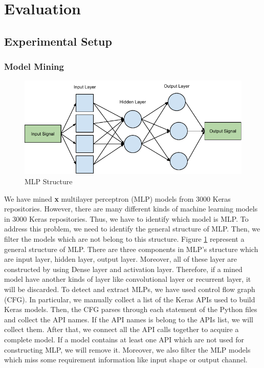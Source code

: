 \section{Evaluation}
\label{sec:evaluation}
\subsection{Experimental Setup}
\subsubsection{\textbf{Model Mining}}
\begin{figure}
	\includegraphics[width=0.8\linewidth]{mlp}
	\centering
	\caption{MLP Structure}
	\label{fig:mlp}
\end{figure}
We have mined {\bf x} multilayer perceptron (MLP) models from 3000 Keras repositories. However, there are many different kinds of machine learning models in 3000 Keras repositories. Thus, we have to identify which model is MLP. To address this problem, we need to identify the general structure of MLP. Then, we filter the models which are not belong to this structure. Figure \ref{fig:mlp} represent a general structure of MLP. There are three components in MLP's structure which are input layer, hidden layer, output layer. Moreover, all of these layer are constructed by using Dense layer and activation layer. Therefore, if a mined model have another kinds of layer like convolutional layer or recurrent layer, it will be discarded. To detect and extract MLPs, we have used control flow graph (CFG). In particular, we manually collect a list of the Keras APIs used to build Keras models. Then, the CFG parses through each statement of the Python files and collect the API names. If the API names is belong to the APIs list, we will collect them. After that, we connect all the API calls together to acquire a complete model. If a model contains at least one API which are not used for constructing MLP, we will remove it. Moreover, we also filter the MLP models which miss some requirement information like input shape or output channel.
